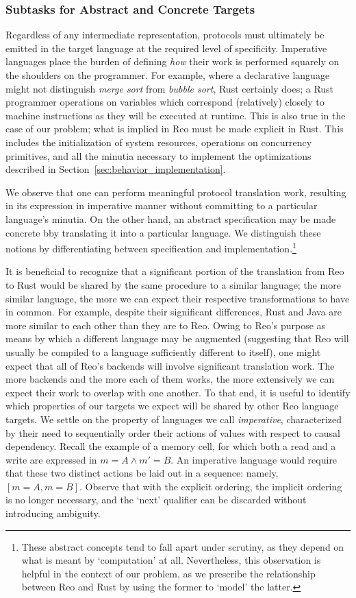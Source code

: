 \subsubsection{Subtasks for Abstract and Concrete Targets}
Regardless of any intermediate representation, protocols must ultimately be emitted in the target language at the required level of specificity. Imperative languages place the burden of defining \textit{how} their work is performed squarely on the shoulders on the programmer. For example, where a declarative language might not distinguish \textit{merge sort} from \textit{bubble sort}, Rust certainly does; a Rust programmer operations on variables which correspond (relatively) closely to machine instructions as they will be executed at runtime. This is also true in the case of our problem; what is implied in Reo must be made explicit in Rust. This includes the initialization of system resources, operations on concurrency primitives, and all the minutia necessary to implement the optimizations described in Section~\ref{sec:behavior_implementation}. 

We observe that one can perform meaningful protocol translation work, resulting in its expression in imperative manner without committing to a particular language's minutia. On the other hand, an abstract specification may be made concrete bby translating it into a particular language. We distinguish these notions by differentiating between specification and implementation.\footnote{These abstract concepts tend to fall apart under scrutiny, as they depend on what is meant by `computation' at all. Nevertheless, this observation is helpful in the context of our problem, as we prescribe the relationship between Reo and Rust by using the former to `model' the latter.}  

It is beneficial to recognize that a significant portion of the translation from Reo to Rust would be shared by the same procedure to a similar language; the more similar language, the more we can expect their respective transformations to have in common. For example, despite their significant differences, Rust and Java are more similar to each other than they are to Reo. Owing to Reo's purpose as means by which a different language may be augmented (suggesting that Reo will usually be compiled to a language sufficiently different to itself), one might expect that all of Reo's backends will involve significant translation work. The more backends and the more each of them works, the more extensively we can expect their work to overlap with one another. To that end, it is useful to identify which properties of our targets we expect will be shared by other Reo language targets. We settle on the property of languages we call \textit{imperative}, characterized by their need to sequentially order their actions of values with respect to causal dependency. Recall the example of a memory cell, for which both a read and a write are expressed in $m=A\wedge{}m'=B$. An imperative language would require that these two distinct actions be laid out in a sequence: namely, $[m=A, m=B]$. Observe that with the explicit ordering, the implicit ordering is no longer necessary, and the `next' qualifier can be discarded without introducing ambiguity.

